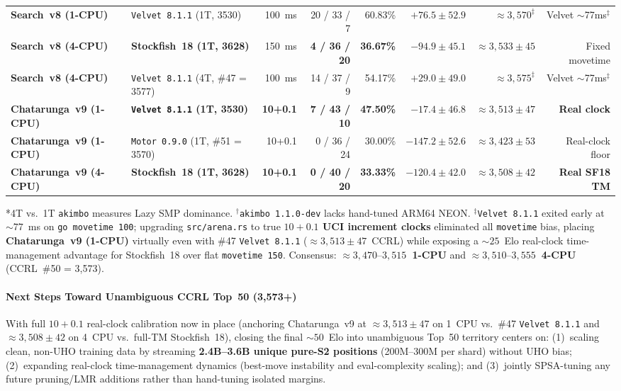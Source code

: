 \documentclass[10.5pt,letterpaper]{article}
\begin{document}
\begin{table}[H]
{\begin{tabular}{@{}llrrrrrr@{}}
\textbf{Search~v8 (1-CPU)} & \texttt{Velvet 8.1.1} (1T, 3530) & 100~ms & 20 / 33 / 7 & 60.83\% & $+76.5 \pm 52.9$ & $\approx 3{,}570^\ddagger$ & Velvet $\sim$77ms$^\ddagger$ \\
\textbf{Search~v8 (4-CPU)} & \textbf{Stockfish~18 (1T, 3628)} & 150~ms & \textbf{4 / 36 / 20} & \textbf{36.67\%} & \textbf{$-94.9 \pm 45.1$} & \textbf{$\approx 3{,}533 \pm 45$} & Fixed movetime \\
\textbf{Search~v8 (4-CPU)} & \texttt{Velvet 8.1.1} (4T, \#47 = 3577) & 100~ms & 14 / 37 / 9 & 54.17\% & $+29.0 \pm 49.0$ & $\approx 3{,}575^\ddagger$ & Velvet $\sim$77ms$^\ddagger$ \\
\midrule
\textbf{Chatarunga~v9 (1-CPU)} & \textbf{\texttt{Velvet 8.1.1} (1T, 3530)} & \textbf{10+0.1} & \textbf{7 / 43 / 10} & \textbf{47.50\%} & \textbf{$-17.4 \pm 46.8$} & \textbf{$\approx 3{,}513 \pm 47$} & \textbf{Real clock} \\
\textbf{Chatarunga~v9 (1-CPU)} & \texttt{Motor 0.9.0} (1T, \#51 = 3570) & 10+0.1 & 0 / 36 / 24 & 30.00\% & $-147.2 \pm 52.6$ & $\approx 3{,}423 \pm 53$ & Real-clock floor \\
\textbf{Chatarunga~v9 (4-CPU)} & \textbf{Stockfish~18 (1T, 3628)} & \textbf{10+0.1} & \textbf{0 / 40 / 20} & \textbf{33.33\%} & \textbf{$-120.4 \pm 42.0$} & \textbf{$\approx 3{,}508 \pm 42$} & \textbf{Real SF18 TM} \\
\bottomrule
\end{tabular}%
}
\par\vspace{3pt}\noindent\scriptsize{*4T vs.\ 1T \texttt{akimbo} measures Lazy SMP dominance. $^\dagger$\texttt{akimbo 1.1.0-dev} lacks hand-tuned ARM64 NEON. $^\ddagger$\texttt{Velvet 8.1.1} exited early at $\sim 77$~ms on \texttt{go movetime 100}; upgrading \texttt{src/arena.rs} to true \textbf{$10+0.1$ UCI increment clocks} eliminated all \texttt{movetime} bias, placing \textbf{Chatarunga~v9 (1-CPU)} virtually even with \#47 \texttt{Velvet 8.1.1} ($\approx 3{,}513 \pm 47$~CCRL) while exposing a $\sim 25$~Elo real-clock time-management advantage for Stockfish~18 over flat \texttt{movetime 150}. Consensus: \textbf{$\approx 3{,}470\text{--}3{,}515$~1-CPU} and \textbf{$\approx 3{,}510\text{--}3{,}555$~4-CPU} (CCRL~\#50 = 3,573).}
\end{table}

\paragraph{Next Steps Toward Unambiguous CCRL Top~50 (3,573+)}
With full $10+0.1$ real-clock calibration now in place (anchoring Chatarunga~v9 at $\approx 3{,}513 \pm 47$ on 1~CPU vs.\ \#47 \texttt{Velvet 8.1.1} and $\approx 3{,}508 \pm 42$ on 4~CPU vs.\ full-TM Stockfish~18), closing the final $\sim 50$~Elo into unambiguous Top~50 territory centers on: (1)~scaling clean, non-UHO training data by streaming \textbf{2.4B--3.6B unique pure-S2 positions} (200M--300M per shard) without UHO bias; (2)~expanding real-clock time-management dynamics (best-move instability and eval-complexity scaling); and (3)~jointly SPSA-tuning any future pruning/LMR additions rather than hand-tuning isolated margins.
\end{document}
